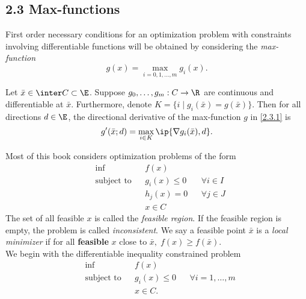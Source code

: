 \documentclass[../borwein-lewis_notes.tex]{subfiles}
\begin{document}
\maketitle
\subsection{2.3 Max-functions}
First order necessary conditions for an optimization problem with 
constraints involving differentiable functions will be obtained by 
considering the \textit{max-function}
\begin{equation}
\label{2.3.1}
g(x) = \max_{i=0,1,\ldots, m} g_i(x).
\end{equation}
\begin{proposition}
Let $\bar x\in\inter C\subset\E$. Suppose $g_0,\ldots, g_m:C\to\R$ 
are continuous and differentiable at $\bar x$. Furthermore, denote 
$K=\{i\mid g_i(\bar x) = g(\bar x)\}$. Then for all directions 
$d\in\E$, the directional derivative of the max-function $g$ 
in \eqref{2.3.1} is
\label{2.3.2}
\begin{equation}
g'(\bar x; d) = \max_{i\in K} \ip{\nabla g_i(\bar x), d}.
\label{2.3.3}
\end{equation}
\end{proposition}
Most of this book considers optimization problems of the form 
\begin{equation}
\begin{aligned}
&\inf && f(x) && \\
&\text{subject to} && g_i(x) \leq 0 && \forall i\in I\\
&&& h_j(x) = 0 && \forall j\in J \\
&&& x\in C
\end{aligned}
\label{2.3.4}
\end{equation}
The set of all feasible $x$ is called the \textit{feasible region}. If 
the feasible region is empty, the problem is called \textit{inconsistent}.
We say a feasible point $\bar x$ is a \textit{local minimizer} if for 
all \textbf{feasible} $x$ close to $\bar x,\; f(x)\geq f(\bar x)$. \\
We begin with the differentiable inequality constrained problem
\begin{equation}
\begin{aligned}
&\inf && f(x) && \\
&\text{subject to}&& g_i(x)\leq 0 && \forall i=1,\ldots,m \\
&&& x\in C.
\end{aligned}
\label{2.3.5}
\end{equation}
\end{document}
